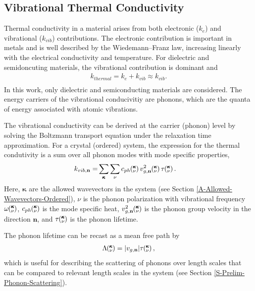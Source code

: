 \documentclass[letterpaper,12pt]{article}
\newcommand{\kv}{\mspace{-4.0mu}\left(\mspace{-8.0mu}\begin{smallmatrix}&\pmb{\kappa} \\&\nu\end{smallmatrix}\mspace{-3.0mu}\right)}
\begin{document}
\subsection{\label{S-Back-Vib-Cond}Vibrational Thermal Conductivity}


Thermal conductivity in a material arises from both electronic ($k_{e}$) and vibrational
($k_{vib}$) contributions.\cite{ashcroft1976,Slack1979} The electronic contribution is important in metals and is well described by the Wiedemann–Franz law, increasing linearly with the electrical conductivity and temperature. For dielectric and semidoncuting materials, the vibrational contribution is dominant and
\begin{equation}\label{EQ:M:k_thermal}
\begin{split}
k_{thermal} = k_{e} + k_{vib} \approx k_{vib}. \\
\end{split}
\end{equation}
In this work, only dielectric and semiconducting materials are considered. The energy carriers of the vibrational conducivitiy are phonons, which are the quanta of energy associated with atomic vibrations.\cite{dove1993,ashcroft1976,srivastava1990,wallace1972} 

The vibrational conductivity can be derived at the carrier (phonon) level by solving the Boltzmann transport equation under the relaxation time approximation.\cite{srivastava1990,ziman2001} For a crystal (ordered) system, the expression for the thermal condutivity is a sum over all phonon modes with mode specific properties,
\begin{equation}\label{EQ:M:k_l,sum}
\begin{split}
k_{vib,\mathbf{n}}=&\sum_{\pmb{\kappa}} \sum_\nu c_{ph}\kv v^{2}_{g,\mathbf{n}}\kv \tau\kv.
\end{split}
\end{equation}
Here, $\pmb{\kappa}$ are the allowed wavevectors in the system (see Section \ref{A-Allowed-Wavevectors-Ordered}), $\nu$ is the phonon polarization with vibrational frequency $\omega \kv$, $c_{ph}\kv$ is the mode specific heat, $v^{2}_{g,\mathbf{n}}\kv$ is the phonon group velocity in the direction $\mathbf{n}$, and $\tau\kv$ is the phonon lifetime.  

The phonon lifetime can be recast as a mean free path by
\begin{equation}\label{EQ:M:phonon_mfp}
\begin{split}
\Lambda\kv = |v_{g,\mathbf{n}}| \tau\kv,
\end{split}
\end{equation}
which is useful for describing the scattering of phonons over length scales that can be compared to relevant length scales in the system (see Section \ref{S-Prelim-Phonon-Scattering}).
\end{document}
